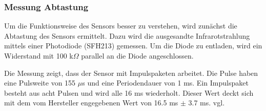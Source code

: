 \subsubsection{Messung Abtastung}
Um die Funktionsweise des Sensors besser zu verstehen, wird zunächst die 
Abtastung des Sensors ermittelt. Dazu wird die ausgesandte Infrarotstrahlung 
mittels einer Photodiode (SFH213) gemessen. Um die Diode zu entladen, wird ein 
Widerstand mit 100 k$\Omega$ parallel an die Diode angeschlossen. 

Die Messung zeigt, dass der Sensor mit Impulspaketen arbeitet. Die Pulse haben 
eine Pulsweite von 155 $\mu$s und eine Periodendauer von 1 ms. Ein Impulspaket 
besteht aus acht Pulsen und wird alle 16 ms wiederholt. Dieser Wert deckt sich 
mit dem vom Hersteller engegebenen Wert von 16.5 ms $\pm$ 3.7 ms. vgl. 
\cite{Datasheet:GP2Y0A710K0F}

